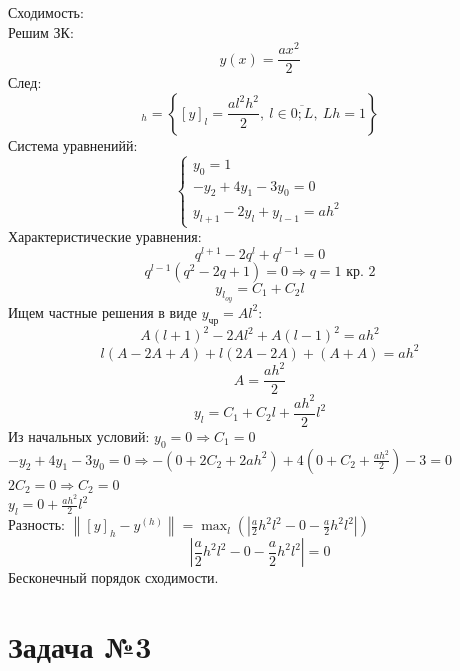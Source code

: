 \documentclass[a4paper, 12pt]{article}
\newcommand{\norm}[1]{\left\lVert#1\right\rVert}
\begin{document}
	Сходимость:\\
	Решим ЗК:
	\begin{equation*}
	y(x)=\frac{ax^2}{2}
	\end{equation*}
	След:
	\begin{equation*}
	[y]_h=\left\lbrace[y]_l=\frac{al^2h^2}{2},\ l\in\overline{0;L},\ Lh=1\right\rbrace
	\end{equation*}
	Система уравненийй:
	\begin{equation*}
	\begin{cases}
	y_0=1\\
	-y_2+4y_1-3y_0=0\\
	y_{l+1}-2y_l+y_{l-1}=ah^2
	\end{cases}
	\end{equation*}
	Характеристические уравнения:
	\begin{equation*}
	q^{l+1}-2q^l+q^{l-1}=0
	\end{equation*}
	\begin{equation*}
	q^{l-1}(q^2-2q+1)=0\Rightarrow q=1\text{ кр. } 2
	\end{equation*}
	\begin{equation*}
	y_{l_{oy}}=C_1+C_2 l
	\end{equation*}
	Ищем частные решения в виде $y_{\text{чр}}=Al^2$:
	\begin{equation*}
	A(l+1)^2-2Al^2+A(l-1)^2=ah^2
	\end{equation*}
	\begin{equation*}
	l(A-2A+A)+l(2A-2A)+(A+A)=ah^2
	\end{equation*}
	\begin{equation*}
	A=\frac{ah^2}{2}
	\end{equation*}
	\begin{equation*}
	y_l=C_1+C_2l+\frac{ah^2}{2}l^2
	\end{equation*}
	Из начальных условий:
	$y_0=0\Rightarrow C_1=0$\\
	$-y_2+4y_1-3y_0=0\Rightarrow-(0+2C_2+2ah^2)+4(0+C_2+\frac{ah^2}{2})-3=0$\\
	$2C_2=0\Rightarrow C_2=0$\\
	$y_l=0+\frac{ah^2}{2}l^2$\\
	Разность: $\norm{[y]_h-y^{(h)}}=\max_l\left(\left|\frac{a}{2}h^2l^2-0-\frac{a}{2}h^2l^2\right|\right)$\\
	\begin{equation*}
		\left|\frac{a}{2}h^2l^2-0-\frac{a}{2}h^2l^2\right|=0
	\end{equation*}
	Бесконечный порядок сходимости.
	\section*{Задача №3}
\end{document}
